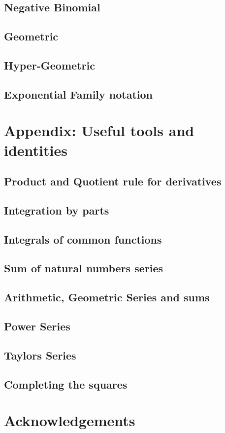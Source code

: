 \documentclass[english, 11pt]{article}
\begin{document}
\subsection{Negative Binomial}
\subsection{Geometric}
\subsection{Hyper-Geometric}
\subsection{Exponential Family notation}

\newpage

\section{Appendix: Useful tools and identities}
\subsection{Product and Quotient rule for derivatives}
\subsection{Integration by parts}
\subsection{Integrals of common functions}
\subsection{Sum of natural numbers series}
\subsection{Arithmetic, Geometric Series and sums}
\subsection{Power Series}
\subsection{Taylors Series}
\subsection{Completing the squares}
\section{Acknowledgements}

  
\end{document}
